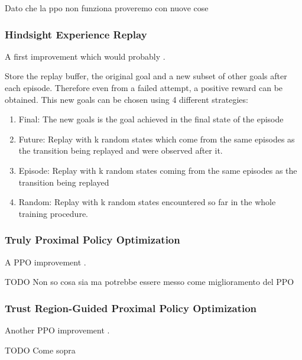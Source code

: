 \documentclass[12pt]{article}
\begin{document}
Dato che la ppo non funziona proveremo con nuove cose

\subsubsection{Hindsight Experience Replay}

A first improvement which would probably \cite{her}.

Store the replay buffer, the original goal and a new subset of other goals after each episode. Therefore even from a failed attempt, a positive reward can be obtained.
This new goals can be chosen using 4 different strategies:
\begin{enumerate}
    \item Final: The new goals is the goal achieved in the final state of the episode
    \item Future: Replay with k random states which come from the same episodes as the transition being replayed and were observed after it.
    \item Episode: Replay with k random states coming from the same episodes as the transition being replayed
    \item Random: Replay with k random states encountered so far in the whole training procedure.
\end{enumerate}

\subsubsection{Truly Proximal Policy Optimization}

A PPO improvement \cite{truly-ppo}.

TODO Non so cosa sia ma potrebbe essere messo come miglioramento del PPO

\subsubsection{Trust Region-Guided Proximal Policy Optimization}

Another PPO improvement \cite{trgppo}.

TODO Come sopra

\newpage

\printbibliography
\end{document}
